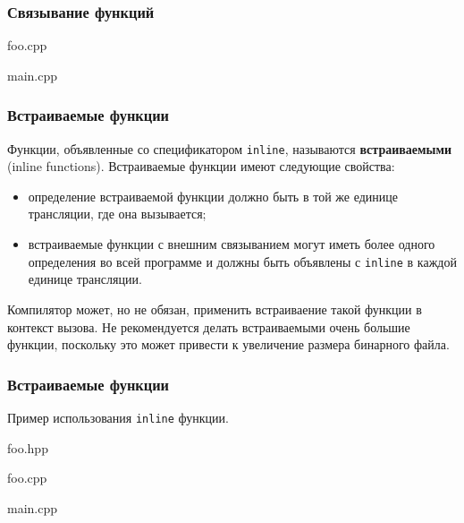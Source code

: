 \documentclass[compress, 8pt]{beamer}
\begin{document}
\begin{frame}[fragile]

    \frametitle{Связывание функций}

    \hfill\break
        {foo.cpp}

        {main.cpp}

\end{frame}

\begin{frame}[fragile]

    \frametitle{Встраиваемые функции}

    Функции, объявленные со спецификатором \verb|inline|\footnotemark{}, называются
    \textbf{встраиваемыми} (inline functions).
    Встраиваемые функции имеют следующие свойства:


    \begin{itemize}
        \item определение встраиваемой функции должно быть в той же единице
            трансляции, где она вызывается;
        \item встраиваемые функции с внешним связыванием могут иметь более
            одного определения во всей программе и должны быть объявлены
            с \verb|inline| в каждой единице трансляции.
    \end{itemize}

    Компилятор может, но не обязан, применить встраиваение\footnotetext{} такой
    функции в контекст вызова.
    Не рекомендуется делать встраиваемыми очень большие функции, поскольку это
    может привести к увеличение размера бинарного файла.


\end{frame}

\begin{frame}[fragile]

    \frametitle{Встраиваемые функции}

    Пример использования \verb|inline| функции.

        {foo.hpp}

        {foo.cpp}

        {main.cpp}

\end{frame}
\end{document}
